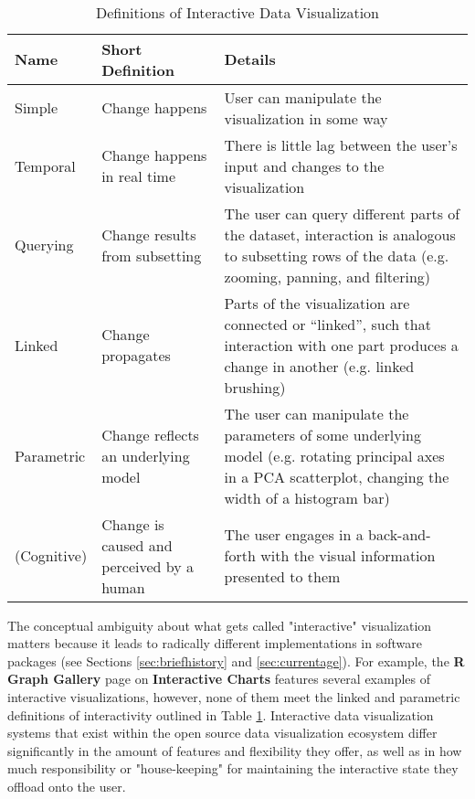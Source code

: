 \documentclass[12pt,a4paper]{article}
\begin{document}
\begin{table}[ht]
\caption{
Definitions of Interactive Data Visualization
}
\centering
\ ~~~~ \\
\label{tab:definitions}
\begin{tabular}{|p{2cm}|p{6cm}|p{8cm}|}
\hline
Name & Short Definition & Details \\
\hline

Simple & Change happens & User can manipulate the visualization in some way \\

Temporal & Change happens in real time & There is little lag between the user's input and changes to the visualization  \\

Querying & Change results from subsetting & The user can query different parts of the dataset, interaction is analogous to subsetting rows of the data (e.g. zooming, panning, and filtering) \\ 

Linked & Change propagates & Parts of the visualization are connected or “linked”, such that interaction with one part produces a change in another (e.g. linked brushing) \\

Parametric & Change reflects an underlying model & The user can manipulate the parameters of some underlying model (e.g. rotating principal axes in a PCA scatterplot, changing the width of a histogram bar) \\

(Cognitive) & Change is caused and perceived by a human & The user engages in a back-and-forth with the visual information presented to them \\

\hline
\end{tabular}
\end{table}

The conceptual ambiguity about what gets called "interactive" visualization matters because it leads to radically different implementations in software packages (see Sections \ref{sec:briefhistory} and \ref{sec:currentage}). For example, the \textbf{R Graph Gallery} page on \textbf{Interactive Charts} \citep{holtz2022} features several examples of interactive visualizations, however, none of them meet the linked and parametric definitions of interactivity outlined in Table \ref{tab:definitions}. Interactive data visualization systems that exist within the open source data visualization ecosystem differ significantly in the amount of features and flexibility they offer, as well as in how much responsibility or "house-keeping" for maintaining the interactive state they offload onto the user.     
\end{document}

